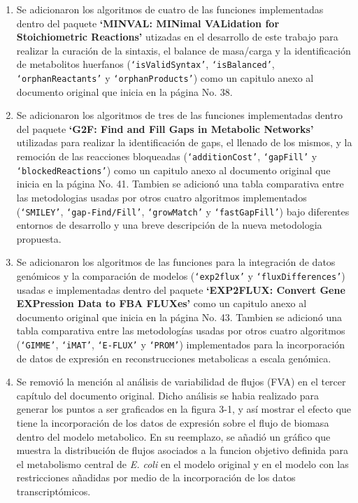 \documentclass[11pt,a4paper]{article}
\begin{document}
\begin{enumerate}
\item Se adicionaron los algoritmos de cuatro de las  funciones implementadas dentro del paquete \textbf{`MINVAL: MINimal VALidation for Stoichiometric Reactions'} utizadas en el desarrollo de este trabajo para realizar la curación de la sintaxis, el balance de masa/carga y  la identificación de metabolitos huerfanos (\texttt{`isValidSyntax'}, \texttt{`isBalanced'}, \texttt{`orphanReactants'} y \texttt{`orphanProducts'}) como un capitulo anexo al documento original que inicia en la página No. 38.

\item Se adicionaron los algoritmos de tres de las funciones implementadas dentro del paquete \textbf{`G2F: Find and Fill Gaps in Metabolic Networks'} utilizadas para realizar la identificación de gaps, el llenado de los mismos, y la remoción de las reacciones bloqueadas (\texttt{`additionCost'}, \texttt{`gapFill'} y \texttt{`blockedReactions'}) como un capitulo anexo al documento original que inicia en la página No. 41. Tambien se adicionó una tabla comparativa entre las metodologias usadas por otros cuatro algoritmos implementados (\texttt{`SMILEY'}, \texttt{`gap-Find/Fill'}, \texttt{`growMatch'} y \texttt{`fastGapFill'}) bajo diferentes entornos de desarrollo y una breve descripción de la nueva metodologia propuesta.

\item Se adicionaron los algoritmos de las funciones para la integración de datos genómicos y la comparación de modelos  (\texttt{`exp2flux'} y \texttt{`fluxDifferences'}) usadas e implementadas dentro del paquete \textbf{`EXP2FLUX: Convert Gene EXPression Data to FBA FLUXes'} como un capitulo anexo al documento original que inicia en la página No. 43. Tambien se adicionó una tabla comparativa entre las metodologías usadas por otros cuatro algoritmos (\texttt{`GIMME'}, \texttt{`iMAT'}, \texttt{`E-FLUX'} y \texttt{`PROM'}) implementados para la incorporación de datos de expresión en reconstrucciones metabolicas a escala genómica.

\item Se removió la mención al análisis de variabilidad de flujos (FVA) en el tercer capítulo del documento original. Dicho análisis se habia realizado para generar los puntos a ser graficados en la figura 3-1, y así mostrar el efecto que tiene la incorporación de los datos de expresión sobre el flujo de biomasa dentro del modelo metabolico. En su reemplazo, se añadió un gráfico que muestra la distribución de flujos asociados a la funcion objetivo definida para el metabolismo central de \textit{E. coli} en el modelo original y en el modelo con las restricciones añadidas por medio de la incorporación de los datos transcriptómicos.


\end{enumerate}
\end{document}
